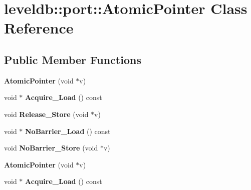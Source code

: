 \hypertarget{classleveldb_1_1port_1_1_atomic_pointer}{}\section{leveldb\+:\+:port\+:\+:Atomic\+Pointer Class Reference}
\label{classleveldb_1_1port_1_1_atomic_pointer}
\subsection*{Public Member Functions}
\begin{DoxyCompactItemize}
\item 
\mbox{\label{classleveldb_1_1port_1_1_atomic_pointer_aa8640431ad3d0ac2f0de62ef6090e89e}} 
{\bfseries Atomic\+Pointer} (void $\ast$v)
\item 
\mbox{\label{classleveldb_1_1port_1_1_atomic_pointer_a88802d6fa5a577739e779ae2d832e4be}} 
void $\ast$ {\bfseries Acquire\+\_\+\+Load} () const
\item 
\mbox{\label{classleveldb_1_1port_1_1_atomic_pointer_a8dfe51c125f71c09a363dae042be63a7}} 
void {\bfseries Release\+\_\+\+Store} (void $\ast$v)
\item 
\mbox{\label{classleveldb_1_1port_1_1_atomic_pointer_ad491b84dca13bb1b24e10fb996f94ab4}} 
void $\ast$ {\bfseries No\+Barrier\+\_\+\+Load} () const
\item 
\mbox{\label{classleveldb_1_1port_1_1_atomic_pointer_aa7faab23777d1fe3c1a96d32a28ed20c}} 
void {\bfseries No\+Barrier\+\_\+\+Store} (void $\ast$v)
\item 
\mbox{\label{classleveldb_1_1port_1_1_atomic_pointer_aa8640431ad3d0ac2f0de62ef6090e89e}} 
{\bfseries Atomic\+Pointer} (void $\ast$v)
\item 
\mbox{\label{classleveldb_1_1port_1_1_atomic_pointer_a18b8f3a214f5ea8c942786d4c18aaa6c}} 
void $\ast$ {\bfseries Acquire\+\_\+\+Load} () const

\end{DoxyCompactItemize}
